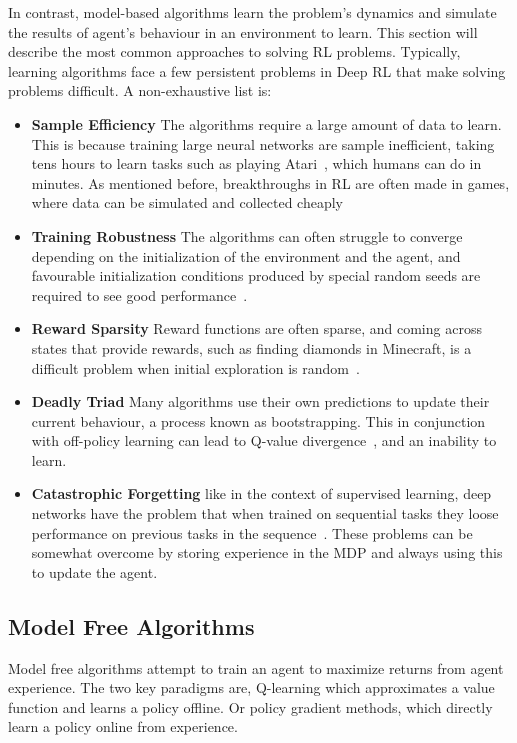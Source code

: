 In contrast, model-based algorithms learn the problem's dynamics and simulate the results of agent's behaviour in an environment to learn. This section will describe the most common approaches to solving RL problems.
Typically, learning algorithms face a few persistent problems in Deep RL that make solving problems difficult. A non-exhaustive list is:
\begin{itemize}
	\item \textbf{Sample Efficiency} The algorithms require a large amount of data to learn. This is because training large neural networks are sample inefficient, taking tens hours to learn tasks such as playing Atari~\cite{hessel2018rainbow}, which humans can do in minutes. As mentioned before, breakthroughs in RL are often made in games, where data can be simulated and collected cheaply\cite{dulac2019challenges}
	\item \textbf{Training Robustness} The algorithms can often struggle to converge depending on the initialization of the environment and the agent, and favourable initialization conditions produced by special random seeds are required to see good performance~\cite{henderson2018deep}.
	\item \textbf{Reward Sparsity} Reward functions are often sparse, and coming across states that provide rewards, such as finding diamonds in Minecraft, is a difficult problem when initial exploration is random~\cite{hafner2023mastering}.
	\item \textbf{Deadly Triad} Many algorithms use their own predictions to update their current behaviour, a process known as bootstrapping. This in conjunction with off-policy learning can lead to Q-value divergence~\cite{van2018deep}, and an inability to learn.
	\item \textbf{Catastrophic Forgetting} like in the context of supervised learning, deep networks have the problem that when trained on sequential tasks they loose performance on previous tasks in the sequence~\cite{kirkpatrick2017overcoming}. These problems can be somewhat overcome by storing experience in the MDP and always using this to update the agent.

\end{itemize}



\subsection{Model Free Algorithms}
Model free algorithms attempt to train an agent to maximize returns from agent experience. The two key paradigms are, Q-learning which approximates a value function and learns a policy offline. Or policy gradient methods, which directly learn a policy online from experience.

